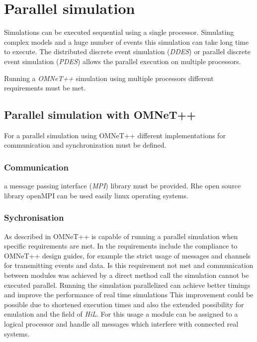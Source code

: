 \chapter{Parallel simulation}
\label{cha:parallel_sim}
Simulations can be executed sequential using a single processor.
Simulating complex models and a huge number of events this simulation can take long time to execute.
The distributed discrete event simulation (\emph{DDES}) or parallel discrete event simulation (\emph{PDES}) allows the parallel execution on multiple processors.

Running a \emph{OMNeT++} simulation using multiple processors different requirements must be met.

\section{Parallel simulation with OMNeT++}
\label{sec:parallel_omnet}

For a parallel simulation using OMNeT++ different implementations for communication and synchronization must be defined.

\subsection{Communication}

a message passing interface (\emph{MPI}) library must be provided.
Rhe open source library openMPI can be used easily linux operating systems.


\subsection{Sychronisation}

As described in \cite{varga_parallel_2003} OMNeT++ is capable of running a parallel simulation when specific requirements are met.
In \cite{varga_parallel_2003} the requirements include the compliance to OMNeT++ design guides, for example the strict usage of messages and channels for transmitting events and data.
Is this requirement not met and communication between modules was achieved by a direct method call the simulation cannot be executed parallel.
Running the simulation parallelized can achieve better timings and improve the performance of real time simulations
This improvement could be possible due to shortened execution times and also the extended possibility for emulation and the field of \emph{HiL}.
For this usage a module can be assigned to a logical processor and handle all messages which interfere with connected real systems.